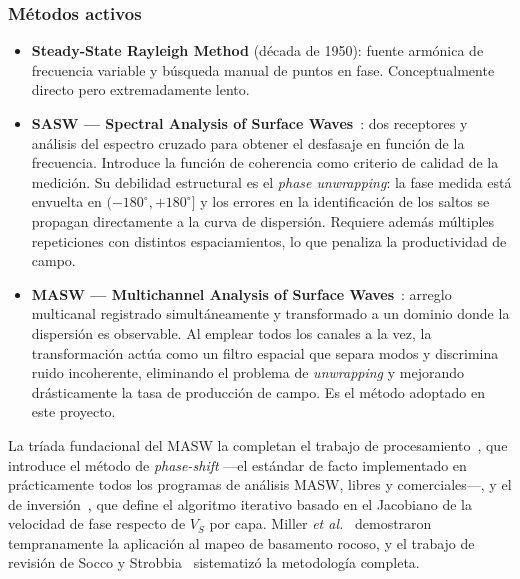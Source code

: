 \subsubsection{M\'etodos activos}

\begin{itemize}[itemsep=0.25em]
    \item \textbf{Steady-State Rayleigh Method} (d\'ecada de 1950): fuente arm\'onica de
    frecuencia variable y b\'usqueda manual de puntos en fase. Conceptualmente directo pero
    extremadamente lento.

    \item \textbf{SASW --- Spectral Analysis of Surface Waves}~\cite{Nazarian1984}: dos
    receptores y an\'alisis del espectro cruzado para obtener el desfasaje en funci\'on de la
    frecuencia. Introduce la funci\'on de coherencia como criterio de calidad de la
    medici\'on. Su debilidad estructural es el \emph{phase unwrapping}: la fase medida est\'a
    envuelta en $(-180^{\circ},+180^{\circ}]$ y los errores en la identificaci\'on de los
    saltos se propagan directamente a la curva de dispersi\'on. Requiere adem\'as m\'ultiples
    repeticiones con distintos espaciamientos, lo que penaliza la productividad de campo.

    \item \textbf{MASW --- Multichannel Analysis of Surface Waves}~\cite{Park1999}: arreglo
    multicanal registrado simult\'aneamente y transformado a un dominio donde la dispersi\'on
    es observable. Al emplear todos los canales a la vez, la transformaci\'on act\'ua como un
    filtro espacial que separa modos y discrimina ruido incoherente, eliminando el
    problema de \emph{unwrapping} y mejorando dr\'asticamente la tasa de producci\'on de
    campo. Es el m\'etodo adoptado en este proyecto.
\end{itemize}

La tr\'iada fundacional del MASW la completan el trabajo de
procesamiento~\cite{Park1998}, que introduce el m\'etodo de \emph{phase-shift} ---el
est\'andar de facto implementado en pr\'acticamente todos los programas de an\'alisis MASW,
libres y comerciales---, y el de inversi\'on~\cite{Xia1999}, que define el algoritmo
iterativo basado en el Jacobiano de la velocidad de fase respecto de $V_S$ por capa.
Miller \emph{et al.}~\cite{Miller1999} demostraron tempranamente la aplicaci\'on al mapeo
de basamento rocoso, y el trabajo de revisi\'on de Socco y Strobbia~\cite{Socco2004}
sistematiz\'o la metodolog\'ia completa.

